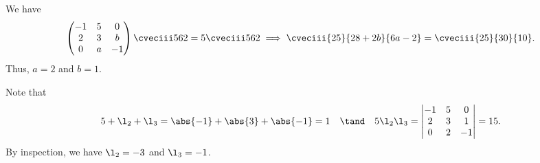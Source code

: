 \begin{solution}
    \begin{ppart}
        We have \[\begin{pmatrix}-1 & 5 & 0 \\ 2 & 3 & b \\ 0 & a & -1\end{pmatrix} \cveciii562 = 5\cveciii562 \implies \cveciii{25}{28+2b}{6a-2} = \cveciii{25}{30}{10}.\] Thus, $a = 2$ and $b = 1$.
    \end{ppart}
    \begin{ppart}
        Note that \[5 + \l_2 + \l_3 = \abs{-1} + \abs{3} + \abs{-1} = 1 \quad \tand \quad 5\l_2\l_3 = \begin{vmatrix}-1 & 5 & 0 \\ 2 & 3 & 1 \\ 0 & 2 & -1\end{vmatrix} = 15.\] By inspection, we have $\l_2 = -3$ and $\l_3 = -1$.


\end{ppart}
\end{solution}
